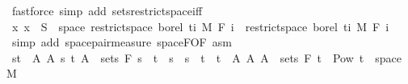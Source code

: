 \begin{isabellebody}
\ {\isacharparenleft}{\kern0pt}fastforce\ simp\ add{\isacharcolon}{\kern0pt}\ sets{\isacharunderscore}{\kern0pt}restrict{\isacharunderscore}{\kern0pt}space{\isacharunderscore}{\kern0pt}iff{\isacharparenright}{\kern0pt}\isanewline
\ \ \ \ \isamarkupfalse%
\isanewline
\ \ \ \ \isamarkupfalse%
\ {\isachardoublequoteopen}{\isacharparenleft}{\kern0pt}{\isasymlambda}x{\isachardot}{\kern0pt}\ x{\isacharparenright}{\kern0pt}\ {\isacharminus}{\kern0pt}{\isacharbackquote}{\kern0pt}\ S\ {\isasyminter}\ space\ {\isacharparenleft}{\kern0pt}restrict{\isacharunderscore}{\kern0pt}space\ borel\ {\isacharbraceleft}{\kern0pt}ti{\isacharbraceright}{\kern0pt}\ {\isasymOtimes}\isactrlsub M\ F\ i{\isacharparenright}{\kern0pt}\ {\isasymin}\ restrict{\isacharunderscore}{\kern0pt}space\ borel\ {\isacharbraceleft}{\kern0pt}ti{\isacharbraceright}{\kern0pt}\ {\isasymOtimes}\isactrlsub M\ F\ i{\isachardoublequoteclose}\ \isamarkupfalse%
\ {\isacharparenleft}{\kern0pt}simp\ add{\isacharcolon}{\kern0pt}\ space{\isacharunderscore}{\kern0pt}pair{\isacharunderscore}{\kern0pt}measure\ space{\isacharunderscore}{\kern0pt}F{\isacharbrackleft}{\kern0pt}OF\ asm{\isacharbrackright}{\kern0pt}{\isacharparenright}{\kern0pt}\isanewline
\ \ \isacommand{{\isacharbraceright}{\kern0pt}}\isamarkupfalse%
\isanewline
\ \ \isamarkupfalse%
\ \isamarkupfalse%
\ {\isachardoublequoteopen}{\isacharbraceleft}{\kern0pt}{\isacharbraceleft}{\kern0pt}s{\isacharless}{\kern0pt}{\isachardot}{\kern0pt}{\isachardot}{\kern0pt}t{\isacharbraceright}{\kern0pt}\ {\isasymtimes}\ A\ {\isacharbar}{\kern0pt}A\ s\ t{\isachardot}{\kern0pt}\ A\ {\isasymin}\ sets\ {\isacharparenleft}{\kern0pt}F\ s{\isacharparenright}{\kern0pt}\ {\isasymand}\ t\ {\isasymle}\ s\ {\isasymand}\ s\ {\isacharless}{\kern0pt}\ t{\isacharbraceright}{\kern0pt}\ {\isasymunion}\ {\isacharbraceleft}{\kern0pt}{\isacharbraceleft}{\kern0pt}t\ {\isasymtimes}\ A\ {\isacharbar}{\kern0pt}A{\isachardot}{\kern0pt}\ A\ {\isasymin}\ sets\ {\isacharparenleft}{\kern0pt}F\ t\ {\isasymsubseteq}\ Pow\ {\isacharparenleft}{\kern0pt}{\isacharbraceleft}{\kern0pt}t\ {\isasymtimes}\ space\ M{\isacharparenright}{\kern0pt}{\isachardoublequoteclose}\ \isamarkupfalse%

\end{isabellebody}
